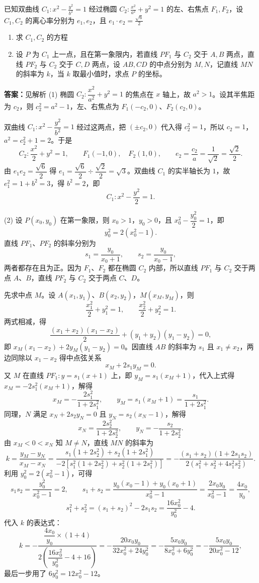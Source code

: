 \begin{problem}
已知双曲线 $C_1:x^{2}-\frac{y^{2}}{b^{2}}=1$ 经过椭圆 $C_2:\frac{x^{2}}{a^{2}}+y^{2}=1$ 的左、右焦点 $F_1,F_2$，设 $C_1,C_2$ 的离心率分别为 $e_1,e_2$，且 $e_1\cdot e_2=\frac{\sqrt{6}}{2}$
\begin{enumerate}
\item 求 $C_1,C_2$ 的方程
\item 设 $P$ 为 $C_1$ 上一点，且在第一象限内，若直线 $PF_1$ 与 $C_2$ 交于 $A,B$ 两点，直线 $PF_2$ 与 $C_2$ 交于 $C,D$ 两点，设 $AB,CD$ 的中点分别为 $M,N$，记直线 $MN$ 的斜率为 $k$，当 $k$ 取最小值时，求点 $P$ 的坐标。
\end{enumerate}
\begin{solution}
\textbf{答案：}见解析
(1) 椭圆 $C_2:\dfrac{x^2}{a^2}+y^2=1$ 的焦点在 $x$ 轴上，故 $a^2>1$。设其半焦距为 $c_2$，则 $c_2^2=a^2-1$，左、右焦点为 $F_1(-c_2,0)$、$F_2(c_2,0)$。

双曲线 $C_1:x^2-\dfrac{y^2}{b^2}=1$ 经过这两点，把 $(\pm c_2,0)$ 代入得 $c_2^2=1$，所以 $c_2=1$，$a^2=c_2^2+1=2$。于是
\[
C_2:\frac{x^2}{2}+y^2=1,\qquad F_1(-1,0),\quad F_2(1,0),\qquad e_2=\frac{c_2}{a}=\frac{1}{\sqrt{2}}=\frac{\sqrt{2}}{2}.
\]
由 $e_1e_2=\dfrac{\sqrt{6}}{2}$ 得 $e_1=\dfrac{\sqrt{6}}{2}\div\dfrac{\sqrt{2}}{2}=\sqrt{3}$。双曲线 $C_1$ 的实半轴长为 $1$，故 $e_1^2=1+b^2=3$，得 $b^2=2$，即
\[
C_1:x^2-\frac{y^2}{2}=1 .
\]

(2) 设 $P(x_0,y_0)$ 在第一象限，则 $x_0>1$，$y_0>0$，且 $x_0^2-\dfrac{y_0^2}{2}=1$，即
\[
y_0^2=2\left(x_0^2-1\right).
\]
直线 $PF_1$、$PF_2$ 的斜率分别为
\[
s_1=\frac{y_0}{x_0+1},\qquad s_2=\frac{y_0}{x_0-1},
\]
两者都存在且为正。因为 $F_1$、$F_2$ 都在椭圆 $C_2$ 内部，所以直线 $PF_1$ 与 $C_2$ 交于两点 $A$、$B$，直线 $PF_2$ 与 $C_2$ 交于两点 $C$、$D$。

先求中点 $M$。设 $A(x_1,y_1)$、$B(x_2,y_2)$，$M(x_M,y_M)$，则
\[
\frac{x_1^2}{2}+y_1^2=1,\qquad \frac{x_2^2}{2}+y_2^2=1 .
\]
两式相减，得
\[
\frac{(x_1+x_2)(x_1-x_2)}{2}+(y_1+y_2)(y_1-y_2)=0,
\]
即 $x_M(x_1-x_2)+2y_M(y_1-y_2)=0$。因直线 $AB$ 的斜率为 $s_1$ 且 $x_1\neq x_2$，两边同除以 $x_1-x_2$ 得中点弦关系
\[
x_M+2s_1y_M=0 .
\]
又 $M$ 在直线 $PF_1:y=s_1(x+1)$ 上，即 $y_M=s_1(x_M+1)$，代入上式得 $x_M=-2s_1^2(x_M+1)$，解得
\[
x_M=-\frac{2s_1^2}{1+2s_1^2},\qquad y_M=s_1(x_M+1)=\frac{s_1}{1+2s_1^2}.
\]
同理，$N$ 满足 $x_N+2s_2y_N=0$ 且 $y_N=s_2(x_N-1)$，解得
\[
x_N=\frac{2s_2^2}{1+2s_2^2},\qquad y_N=-\frac{s_2}{1+2s_2^2}.
\]
由 $x_M<0<x_N$ 知 $M\neq N$，直线 $MN$ 的斜率为
\[
k=\frac{y_M-y_N}{x_M-x_N}
=\frac{s_1\left(1+2s_2^2\right)+s_2\left(1+2s_1^2\right)}{-2\left[s_1^2\left(1+2s_2^2\right)+s_2^2\left(1+2s_1^2\right)\right]}
=-\frac{(s_1+s_2)\left(1+2s_1s_2\right)}{2\left(s_1^2+s_2^2+4s_1^2s_2^2\right)} .
\]
利用 $y_0^2=2\left(x_0^2-1\right)$，可得
\[
s_1s_2=\frac{y_0^2}{x_0^2-1}=2,\qquad
s_1+s_2=\frac{y_0(x_0-1)+y_0(x_0+1)}{x_0^2-1}=\frac{2x_0y_0}{x_0^2-1}=\frac{4x_0}{y_0},
\]
\[
s_1^2+s_2^2=(s_1+s_2)^2-2s_1s_2=\frac{16x_0^2}{y_0^2}-4 .
\]
代入 $k$ 的表达式：
\[
k=-\frac{\dfrac{4x_0}{y_0}\times(1+4)}{2\left(\dfrac{16x_0^2}{y_0^2}-4+16\right)}
=-\frac{20x_0y_0}{32x_0^2+24y_0^2}
=-\frac{5x_0y_0}{8x_0^2+6y_0^2}
=-\frac{5x_0y_0}{20x_0^2-12},
\]
最后一步用了 $6y_0^2=12x_0^2-12$。


\end{solution}
\end{problem}
